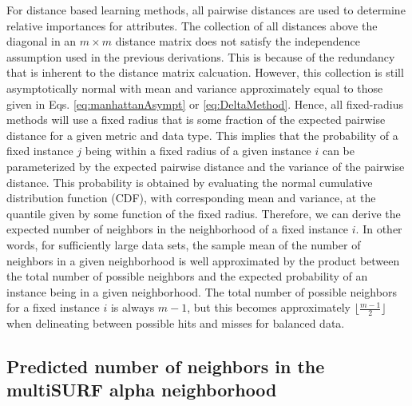 \documentclass[10pt,letterpaper]{article}\usepackage[]{graphicx}\usepackage[]{color}
\begin{document}
For distance based learning methods, all pairwise distances are used to determine relative importances for attributes. The collection of all distances above the diagonal in an $m \times m$ distance matrix does not satisfy the independence assumption used in the previous derivations. This is because of the redundancy that is inherent to the distance matrix calcuation. However, this collection is still asymptotically normal with mean and variance approximately equal to those given in Eqs. \ref{eq:manhattanAsympt} or \ref{eq:DeltaMethod}. Hence, all fixed-radius methods will use a fixed radius that is some fraction of the expected pairwise distance for a given metric and data type. This implies that the probability of a fixed instance $j$ being within a fixed radius of a given instance $i$ can be parameterized by the expected pairwise distance and the variance of the pairwise distance. This probability is obtained by evaluating the normal cumulative distribution function (CDF), with corresponding mean and variance, at the quantile given by some function of the fixed radius. Therefore, we can derive the expected number of neighbors in the neighborhood of a fixed instance $i$. In other words, for sufficiently large data sets, the sample mean of the number of neighbors in a given neighborhood is well approximated by the product between the total number of possible neighbors and the expected probability of an instance being in a given neighborhood. The total number of possible neighbors for a fixed instance $i$ is always $m-1$, but this becomes approximately $\lfloor{\frac{m - 1}{2}}\rfloor$ when delineating between possible hits and misses for balanced data.

\subsection{Predicted number of neighbors in the multiSURF alpha neighborhood}
\end{document}
